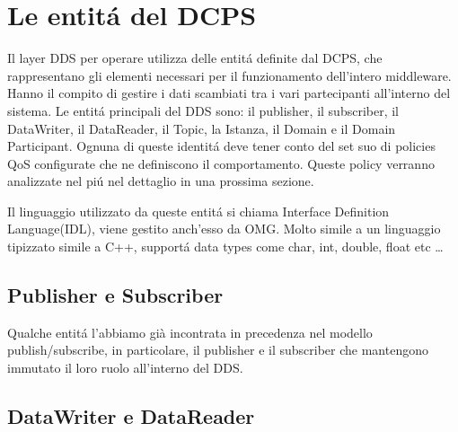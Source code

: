 





\section{Le entitá del DCPS}
Il layer DDS per operare utilizza delle entitá definite dal DCPS, 
che rappresentano gli elementi necessari
per il funzionamento dell'intero middleware. Hanno il compito di gestire i dati
scambiati tra i vari partecipanti all'interno del sistema. 
Le entitá principali del DDS sono: 
il publisher, il subscriber, il DataWriter, il DataReader, il Topic,
la Istanza, il Domain e il Domain Participant.
Ognuna di queste identitá deve tener conto del set suo di policies QoS configurate
che ne definiscono il comportamento. Queste policy verranno analizzate 
nel piú nel dettaglio in una prossima sezione.

Il linguaggio utilizzato da queste entitá si chiama Interface 
Definition Language(IDL),
viene gestito anch'esso da OMG. Molto simile a un linguaggio tipizzato 
simile a C++, supportá data types come char, int, double, float etc
\cite{1494965} \dots


\subsection{Publisher e Subscriber}

Qualche entitá l'abbiamo già incontrata
in precedenza nel modello publish/subscribe, in particolare, il publisher e 
il subscriber che mantengono immutato il loro ruolo all'interno del DDS.

\subsection{DataWriter e DataReader}

